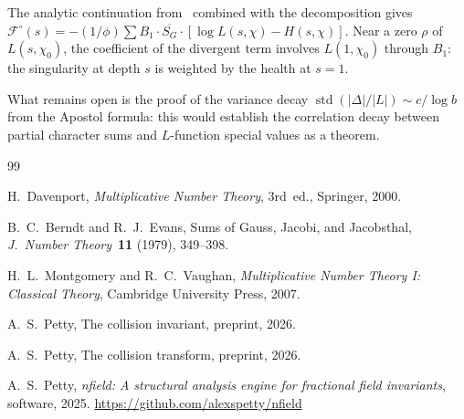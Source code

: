 \documentclass[12pt]{amsart}
\theoremstyle{definition}
\theoremstyle{remark}
\begin{document}
The analytic continuation from~\cite{paperB}
combined with the decomposition gives
$\mathcal{F}^{\circ}(s)
= -(1/\phi) \sum B_1 \cdot \overline{S_G}
\cdot [\log L(s, \chi) - H(s, \chi)]$.
Near a zero $\rho$ of $L(s, \chi_0)$, the
coefficient of the divergent term involves
$L(1, \chi_0)$ through $B_1$: the singularity at
depth $s$ is weighted by the health at $s = 1$.

What remains open is the proof of the variance decay
$\operatorname{std}(|\Delta|/|L|) \sim c/\log b$
from the Apostol formula: this would establish the
correlation decay between partial character sums and
$L$-function special values as a theorem.

\begin{thebibliography}{99}

H.~Davenport,
\emph{Multiplicative Number Theory},
3rd~ed., Springer, 2000.

B.~C.~Berndt and R.~J.~Evans,
Sums of Gauss, Jacobi, and Jacobsthal,
\emph{J.\ Number Theory}\ \textbf{11} (1979),
349--398.

H.~L.~Montgomery and R.~C.~Vaughan,
\emph{Multiplicative Number Theory I: Classical Theory},
Cambridge University Press, 2007.

A.~S.~Petty,
The collision invariant,
preprint, 2026.

A.~S.~Petty,
The collision transform,
preprint, 2026.

A.~S.~Petty,
\emph{nfield: A structural analysis engine for
fractional field invariants},
software, 2025.
\url{https://github.com/alexspetty/nfield}

\end{thebibliography}
\end{document}
